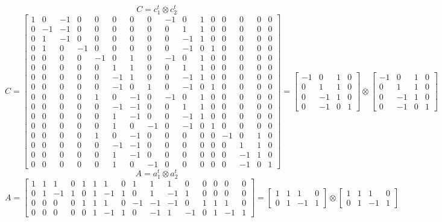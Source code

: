 \documentclass{article}%
\begin{document}
\[%
C = c_1^t \otimes c_2^t%
\]%
\[%
C = \left[\begin{array}{cccccccccccccccc}1 & 0 & -1 & 0 & 0 & 0 & 0 & 0 & -1 & 0 & 1 & 0 & 0 & 0 & 0 & 0\\0 & -1 & -1 & 0 & 0 & 0 & 0 & 0 & 0 & 1 & 1 & 0 & 0 & 0 & 0 & 0\\0 & 1 & -1 & 0 & 0 & 0 & 0 & 0 & 0 & -1 & 1 & 0 & 0 & 0 & 0 & 0\\0 & 1 & 0 & -1 & 0 & 0 & 0 & 0 & 0 & -1 & 0 & 1 & 0 & 0 & 0 & 0\\0 & 0 & 0 & 0 & -1 & 0 & 1 & 0 & -1 & 0 & 1 & 0 & 0 & 0 & 0 & 0\\0 & 0 & 0 & 0 & 0 & 1 & 1 & 0 & 0 & 1 & 1 & 0 & 0 & 0 & 0 & 0\\0 & 0 & 0 & 0 & 0 & -1 & 1 & 0 & 0 & -1 & 1 & 0 & 0 & 0 & 0 & 0\\0 & 0 & 0 & 0 & 0 & -1 & 0 & 1 & 0 & -1 & 0 & 1 & 0 & 0 & 0 & 0\\0 & 0 & 0 & 0 & 1 & 0 & -1 & 0 & -1 & 0 & 1 & 0 & 0 & 0 & 0 & 0\\0 & 0 & 0 & 0 & 0 & -1 & -1 & 0 & 0 & 1 & 1 & 0 & 0 & 0 & 0 & 0\\0 & 0 & 0 & 0 & 0 & 1 & -1 & 0 & 0 & -1 & 1 & 0 & 0 & 0 & 0 & 0\\0 & 0 & 0 & 0 & 0 & 1 & 0 & -1 & 0 & -1 & 0 & 1 & 0 & 0 & 0 & 0\\0 & 0 & 0 & 0 & 1 & 0 & -1 & 0 & 0 & 0 & 0 & 0 & -1 & 0 & 1 & 0\\0 & 0 & 0 & 0 & 0 & -1 & -1 & 0 & 0 & 0 & 0 & 0 & 0 & 1 & 1 & 0\\0 & 0 & 0 & 0 & 0 & 1 & -1 & 0 & 0 & 0 & 0 & 0 & 0 & -1 & 1 & 0\\0 & 0 & 0 & 0 & 0 & 1 & 0 & -1 & 0 & 0 & 0 & 0 & 0 & -1 & 0 & 1\end{array}\right] = \left[\begin{matrix}-1 & 0 & 1 & 0\\0 & 1 & 1 & 0\\0 & -1 & 1 & 0\\0 & -1 & 0 & 1\end{matrix}\right] \otimes \left[\begin{matrix}-1 & 0 & 1 & 0\\0 & 1 & 1 & 0\\0 & -1 & 1 & 0\\0 & -1 & 0 & 1\end{matrix}\right]%
\]%
\[%
A = a_1^t \otimes a_2^t%
\]%
\[%
A = \left[\begin{array}{cccccccccccccccc}1 & 1 & 1 & 0 & 1 & 1 & 1 & 0 & 1 & 1 & 1 & 0 & 0 & 0 & 0 & 0\\0 & 1 & -1 & 1 & 0 & 1 & -1 & 1 & 0 & 1 & -1 & 1 & 0 & 0 & 0 & 0\\0 & 0 & 0 & 0 & 1 & 1 & 1 & 0 & -1 & -1 & -1 & 0 & 1 & 1 & 1 & 0\\0 & 0 & 0 & 0 & 0 & 1 & -1 & 1 & 0 & -1 & 1 & -1 & 0 & 1 & -1 & 1\end{array}\right] = \left[\begin{matrix}1 & 1 & 1 & 0\\0 & 1 & -1 & 1\end{matrix}\right] \otimes \left[\begin{matrix}1 & 1 & 1 & 0\\0 & 1 & -1 & 1\end{matrix}\right]%
\]%
\end{document}
